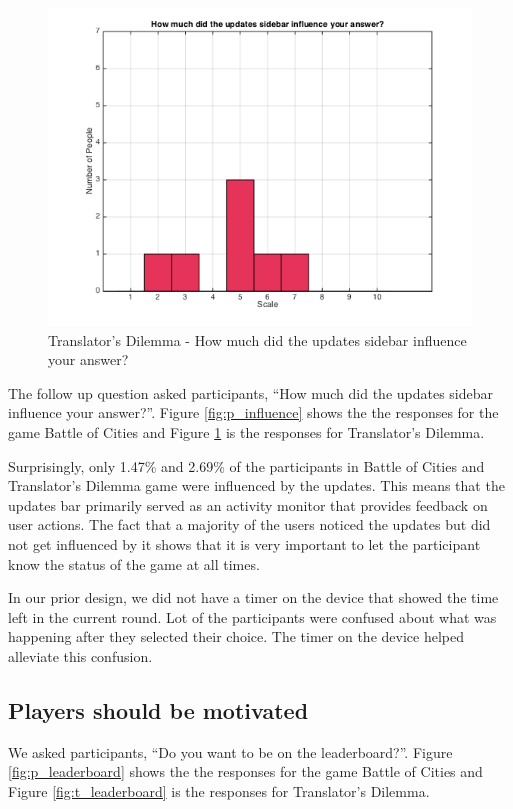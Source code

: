 \documentclass{sig-alternate}
\begin{document}
\begin{figure}
	\includegraphics[width=\linewidth]{t_influence.png}
	\caption{Translator's Dilemma - How much did the updates sidebar influence your answer?}
	\label{fig:t_influence}
\end{figure}

The follow up question asked participants, ``How much did the updates sidebar influence your answer?''. Figure \ref{fig:p_influence} shows the the responses for the game Battle of Cities and Figure \ref{fig:t_influence} is the responses for Translator's Dilemma.

Surprisingly, only 1.47\% and 2.69\% of the participants in Battle of Cities and Translator's Dilemma game were influenced by the updates. This means that the updates bar primarily served as an activity monitor that provides feedback on user actions. The fact that a majority of the users noticed the updates but did not get influenced by it shows that it is very important to let the participant know the status of the game at all times.

In our prior design, we did not have a timer on the device that showed the time left in the current round. Lot of the participants were confused about what was happening after they selected their choice. The timer on the device helped alleviate this confusion.

\subsection{Players should be motivated}
We asked participants, ``Do you want to be on the leaderboard?''. Figure \ref{fig:p_leaderboard} shows the the responses for the game Battle of Cities and Figure \ref{fig:t_leaderboard} is the responses for Translator's Dilemma.
\end{document}
